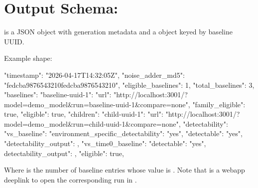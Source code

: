 \documentclass[11pt]{article}
\begin{document}
\section*{Output Schema: }

 is a JSON object with generation metadata and a  object keyed by baseline UUID.

Example shape:

\begin{DocCode}
{
  "timestamp": "2026-04-17T14:32:05Z",
  "noise_adder_md5": "fedcba9876543210fedcba9876543210",
  "eligible_baselines": 1,
  "total_baselines": 3,
  "baselines": {
    "baseline-uuid-1": {
      "url": "http://localhost:3001/?model=demo_model&run=baseline-uuid-1&compare=none",
      "family_eligible": true,
      "eligible": true,
      "children": {
        "child-uuid-1": {
          "url": "http://localhost:3001/?model=demo_model&run=child-uuid-1&compare=none",
          "detectability": {
            "vs_baseline": {
              "environment_specific_detectability": "yes",
              "detectable": "yes",
              "detectability_output": 
            },
            "vs_time0_baseline": {
              "detectable": "yes",
              detectability_output": 
            }
          },
          "eligible": true,
        }
      }
    }
  }
}
\end{DocCode}

Where  is the number of baseline entries whose  value is .
Note that  is a webapp deeplink to open the corresponding run in .
\end{document}
